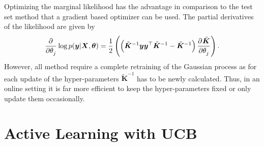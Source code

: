 \documentclass[11pt,a4paper]{scrreprt}
\newcommand{\vc}[1]{\bm{#1}}
\newcommand{\mat}[1]{\bm{#1}}
\newcommand{\T}{^{\top}}
\begin{document}
Optimizing the marginal likelihood has the advantage in comparison to the test 
set method that a gradient based optimizer can be used. The partial derivatives 
of the likelihood are given by
\begin{equation}
    \dpd{}{\theta_j} \log p(\vc y | \mat X, \vc\theta) = \frac{1}{2} 
    \del{\del{\tilde{\mat K}^{-1}\vc y \vc y\T \tilde{\mat K}^{-1} - \tilde{\mat 
                K}^{-1}} \dpd{\tilde{\mat K}}{\theta_j}} \text{.}
\end{equation}
However, all method require a complete retraining of the Gaussian process as for 
each update of the hyper-parameters $\tilde{\mat K}^{-1}$ has to be newly 
calculated. Thus, in an online setting it is far more efficient to keep the 
hyper-parameters fixed or only update them occasionally.

\section{Active Learning with UCB}

\printbibliography
\end{document}
